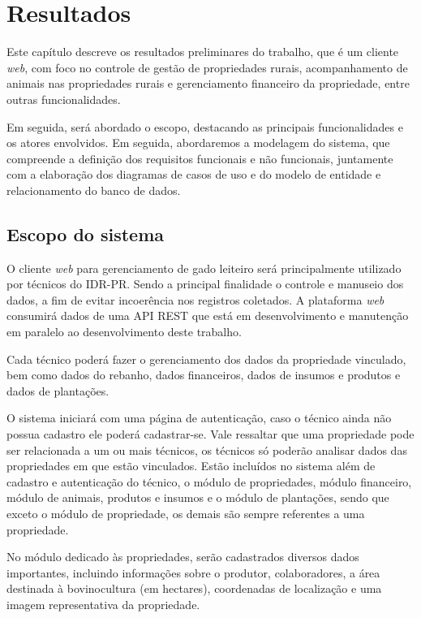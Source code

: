 
\chapter{Resultados}\label{cap:resultados}

Este capítulo descreve os resultados preliminares do trabalho, que é um cliente \textit{web}, com foco no controle de gestão de propriedades rurais, acompanhamento de animais nas propriedades rurais e gerenciamento financeiro da propriedade, entre outras funcionalidades.

Em seguida, será abordado o escopo, destacando as principais funcionalidades e os atores envolvidos. Em seguida, abordaremos a modelagem do sistema, que compreende a definição dos requisitos funcionais e não funcionais, juntamente com a elaboração dos diagramas de casos de uso e do modelo de entidade e relacionamento do banco de dados.

\section{Escopo do sistema}\label{sec:escopoSistema}

O cliente \textit{web} para gerenciamento de gado leiteiro será principalmente utilizado por técnicos do \gls{IDR-PR}. Sendo a principal finalidade o controle e manuseio dos dados, a fim de evitar incoerência nos registros coletados. A plataforma \textit{web} consumirá dados de uma \gls{API} \gls{REST} que está em desenvolvimento e manutenção em paralelo ao desenvolvimento deste trabalho.

Cada técnico poderá fazer o gerenciamento dos dados da propriedade vinculado, bem como dados do rebanho, dados financeiros, dados de insumos e produtos e dados de plantações.

O sistema iniciará com uma página de autenticação, caso o técnico ainda não possua cadastro ele poderá cadastrar-se. Vale ressaltar que uma propriedade pode ser relacionada a um ou mais técnicos, os técnicos só poderão analisar dados das propriedades em que estão vinculados. Estão incluídos no sistema além de cadastro e autenticação do técnico, o módulo de propriedades, módulo financeiro, módulo de animais, produtos e insumos e o módulo de plantações, sendo que exceto o módulo de propriedade, os demais são sempre referentes a uma propriedade.

No módulo dedicado às propriedades, serão cadastrados diversos dados importantes, incluindo informações sobre o produtor, colaboradores, a área destinada à bovinocultura (em hectares), coordenadas de localização e uma imagem representativa da propriedade.

